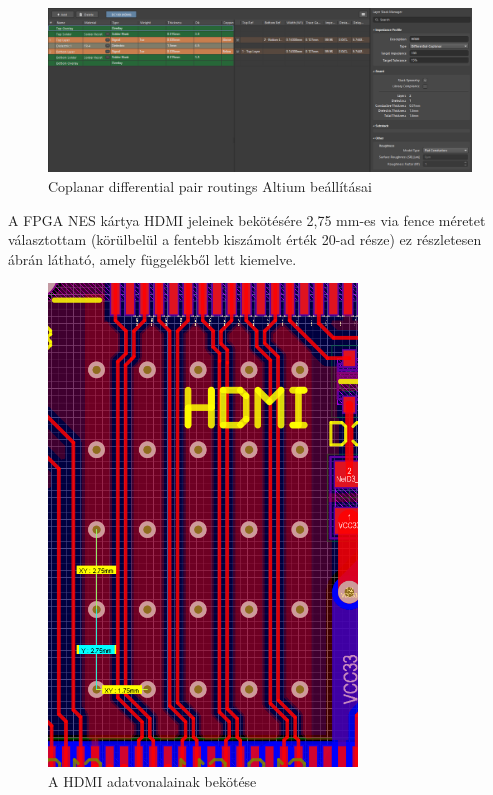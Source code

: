 	\begin{figure}[H]
		\centering
		\includegraphics[width=150mm, keepaspectratio]{figures/Impedance-control}
		\caption{Coplanar differential pair routings Altium beállításai}
		\label{fig:Impedance-control}
	\end{figure}
	
	A FPGA NES kártya HDMI jeleinek bekötésére 2,75 mm-es via fence méretet választottam (körülbelül a fentebb kiszámolt érték 20-ad része) ez részletesen  ábrán látható, amely  függelékből lett kiemelve.
	
	\begin{figure}[H]
	\centering
	\includegraphics[width=82mm, keepaspectratio, angle=90]{figures/HDMI-Differencial-pair-routing}
	\caption{A HDMI adatvonalainak bekötése}
	\label{fig:HDMI-Differencial-pair-routing}
	\end{figure}
	
